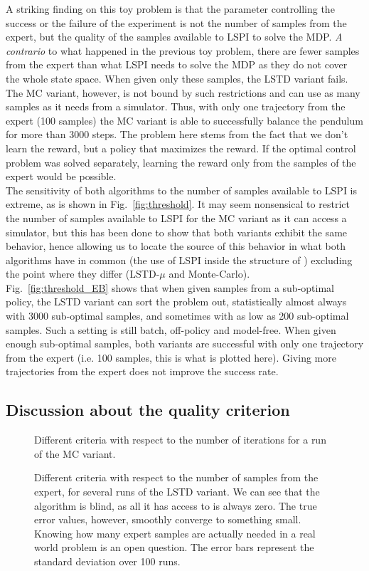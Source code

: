 \documentclass{llncs}
\begin{document}
A striking finding on this toy problem is that the parameter controlling the success or the failure of the experiment is not the number of samples from the expert, but the quality of the samples available to LSPI to solve the MDP. \emph{A contrario} to what happened in the previous toy problem, there are fewer samples from the expert than what LSPI needs to solve the MDP as they do not cover the whole state space. When given only these samples, the LSTD variant fails. The MC variant, however, is not bound by such restrictions and can use as many samples as it needs from a simulator. Thus, with only one trajectory from the expert (100 samples) the MC variant is able to successfully balance the pendulum for more than 3000 steps. The problem here stems from the fact that we don't learn the reward, but a policy that maximizes the reward. If the optimal control problem was solved separately, learning the reward only from the samples of the expert would be possible.\\

The sensitivity of both algorithms to the number of samples available to LSPI is extreme, as is shown in Fig.~\ref{fig:threshold}. It may seem nonsensical to restrict the number of samples available to LSPI for the MC variant as it can access a simulator, but this has been done to show that both variants exhibit the same behavior, hence allowing us to locate the source of this behavior in what both algorithms have in common (the use of LSPI inside the structure of \citep{abbeel2004apprenticeship}) excluding the point where they differ (LSTD-$\mu$ and Monte-Carlo).\\

Fig.~\ref{fig:threshold_EB} shows that when given samples from a sub-optimal policy, the LSTD variant can sort the problem out, statistically almost always with 3000 sub-optimal samples, and sometimes with as low as 200 sub-optimal samples. Such a setting is still batch, off-policy and model-free. When given enough sub-optimal samples, both variants are successful with only one trajectory from the expert (i.e. 100 samples, this is what is plotted here). Giving more trajectories from the expert does not improve the success rate.
\subsection{Discussion about the quality criterion}
\label{ssec:quality}
\begin{figure}
\centering

\caption{Different criteria with respect to the number of iterations for a run of the MC variant.}
\label{fig:A}
\end{figure}
\begin{figure}
\centering

\caption{Different criteria with respect to the number of samples from the expert, for several runs of the LSTD variant. We can see that the algorithm is blind, as all it has access to is always zero. The true error values, however, smoothly converge to something small. Knowing how many expert samples are actually needed in a real world problem is an open question. The error bars represent the standard deviation over 100 runs.}
\label{fig:B}
\end{figure}
\end{document}
